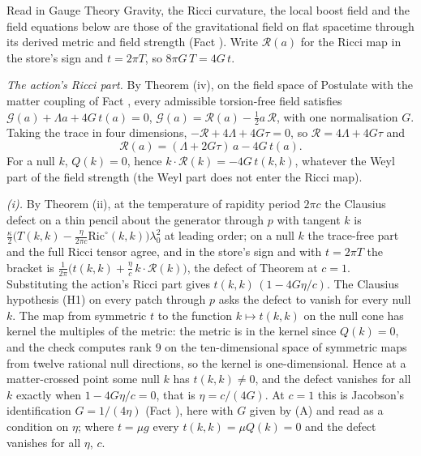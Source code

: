 Read in Gauge Theory Gravity, the Ricci curvature, the local boost field and the field equations below are those of the gravitational field on flat spacetime through its derived metric and field strength (Fact ). Write $\mathcal{R}(a)$ for the Ricci map in the store's sign and $t = 2\pi T$, so $8\pi G\,T = 4G\,t$.

\emph{The action's Ricci part.} By Theorem (iv), on the field space of Postulate  with the matter coupling of Fact , every admissible torsion-free field satisfies $\mathcal{G}(a) + \Lambda a + 4G\,t(a) = 0$, $\mathcal{G}(a) = \mathcal{R}(a) - \tfrac12 a\,\mathcal{R}$, with one normalisation $G$. Taking the trace in four dimensions, $-\mathcal{R} + 4\Lambda + 4G\tau = 0$, so $\mathcal{R} = 4\Lambda + 4G\tau$ and
\[
\mathcal{R}(a) = (\Lambda + 2G\tau)\,a - 4G\,t(a).
\]
For a null $k$, $Q(k) = 0$, hence $k \cdot \mathcal{R}(k) = -4G\,t(k,k)$, whatever the Weyl part of the field strength (the Weyl part does not enter the Ricci map).

\emph{(i).} By Theorem (ii), at the temperature of rapidity period $2\pi c$ the Clausius defect on a thin pencil about the generator through $p$ with tangent $k$ is $\tfrac{\kappa}{2}\big(T(k,k) - \tfrac{\eta}{2\pi c}\mathrm{Ric}^{\circ}(k,k)\big)\lambda_{0}^{2}$ at leading order; on a null $k$ the trace-free part and the full Ricci tensor agree, and in the store's sign and with $t = 2\pi T$ the bracket is $\tfrac{1}{2\pi}\big(t(k,k) + \tfrac{\eta}{c}\,k \cdot \mathcal{R}(k)\big)$, the defect of Theorem  at $c = 1$. Substituting the action's Ricci part gives $t(k,k)\,(1 - 4G\eta/c)$. The Clausius hypothesis (H1) on every patch through $p$ asks the defect to vanish for every null $k$. The map from symmetric $t$ to the function $k \mapsto t(k,k)$ on the null cone has kernel the multiples of the metric: the metric is in the kernel since $Q(k) = 0$, and the check computes rank $9$ on the ten-dimensional space of symmetric maps from twelve rational null directions, so the kernel is one-dimensional. Hence at a matter-crossed point some null $k$ has $t(k,k) \neq 0$, and the defect vanishes for all $k$ exactly when $1 - 4G\eta/c = 0$, that is $\eta = c/(4G)$. At $c = 1$ this is Jacobson's identification $G = 1/(4\eta)$ (Fact ), here with $G$ given by (A) and read as a condition on $\eta$; where $t = \mu g$ every $t(k,k) = \mu Q(k) = 0$ and the defect vanishes for all $\eta$, $c$.

